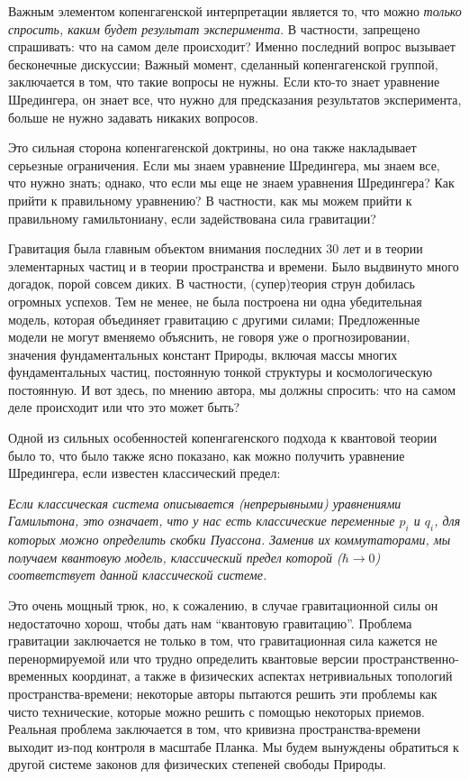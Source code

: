 \documentclass[main.tex]{subfiles}
\begin{document}
Важным элементом копенгагенской интерпретации является то, что можно \textit{только спросить, каким будет результат эксперимента}. В частности, запрещено спрашивать: что на самом деле происходит? Именно последний вопрос вызывает бесконечные дискуссии; Важный момент, сделанный копенгагенской группой, заключается в том, что такие вопросы не нужны. Если кто-то знает уравнение Шредингера, он знает все, что нужно для предсказания результатов эксперимента, больше не нужно задавать никаких вопросов.

Это сильная сторона копенгагенской доктрины, но она также накладывает серьезные ограничения. Если мы знаем уравнение Шредингера, мы знаем все, что нужно знать; однако, что если мы еще не знаем уравнения Шредингера? Как прийти к правильному уравнению? В частности, как мы можем прийти к правильному гамильтониану, если задействована сила гравитации?

Гравитация была главным объектом внимания последних 30 лет и в теории элементарных частиц и в теории пространства и времени. Было выдвинуто много догадок, порой совсем диких. В частности, (супер)теория струн добилась огромных успехов. Тем не менее, не была построена ни одна убедительная модель, которая объединяет гравитацию с другими силами; Предложенные модели не могут вменяемо объяснить, не говоря уже о прогнозировании, значения фундаментальных констант Природы, включая массы многих фундаментальных частиц, постоянную тонкой структуры и космологическую постоянную. И вот здесь, по мнению автора, мы должны спросить: что на самом деле происходит или что это может быть?

Одной из сильных особенностей копенгагенского подхода к квантовой теории было то, что было также ясно показано, как можно получить уравнение Шредингера, если известен классический предел:

\textit{Если классическая система описывается (непрерывными) уравнениями Гамильтона, это означает, что у нас есть классические переменные $p_i$ и $q_i$, для которых можно определить скобки Пуассона. Заменив их коммутаторами, мы получаем квантовую модель, классический предел которой ($\hbar\rightarrow 0$) соответствует данной классической системе.}

Это очень мощный трюк, но, к сожалению, в случае гравитационной силы он недостаточно хорош, чтобы дать нам ``квантовую гравитацию''. Проблема гравитации заключается не только в том, что гравитационная сила кажется не перенормируемой или что трудно определить квантовые версии пространственно-временных координат, а также в физических аспектах нетривиальных топологий пространства-времени; некоторые авторы пытаются решить эти проблемы как чисто технические, которые можно решить с помощью некоторых приемов. Реальная проблема заключается в том, что кривизна пространства-времени выходит из-под контроля в масштабе Планка. Мы будем вынуждены обратиться к другой системе законов для физических степеней свободы Природы.
\end{document}
